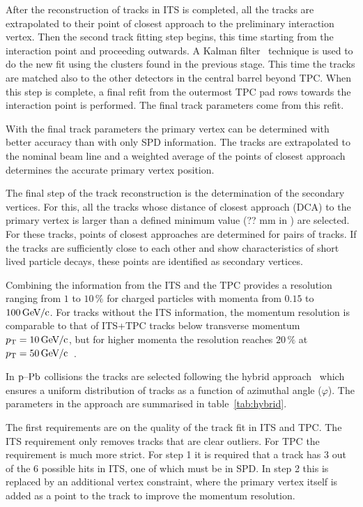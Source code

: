 After the reconstruction of tracks in ITS is completed, all the tracks are extrapolated to their point of closest approach to the preliminary interaction vertex. Then the second track fitting step begins, this time starting from the interaction point and proceeding outwards. A Kalman filter~\cite{Fruhwirth:1987fm} technique is used to do the new fit using the clusters found in the previous stage. This time the tracks are matched also to the other detectors in the central barrel beyond TPC. When this step is complete, a final refit from the outermost TPC pad rows towards the interaction point is performed. The final track parameters come from this refit. 

With the final track parameters the primary vertex can be determined with better accuracy than with only SPD information. The tracks are extrapolated to the nominal beam line and a weighted average of the points of closest approach determines the accurate primary vertex position.

The final step of the track reconstruction is the determination of the secondary vertices. For this, all the tracks whose distance of closest approach (DCA) to the primary vertex is larger than a defined minimum value (?? \unit{mm} in \pPb) are selected. For these tracks, points of closest approaches are determined for pairs of tracks. If the tracks are sufficiently close to each other and show characteristics of short lived particle decays, these points are identified as secondary vertices. 

Combining the information from the ITS and the TPC provides a resolution ranging from $1$ to $10\,\%$ for charged particles with momenta from $0.15$ to $\unit[100]{\GeVc}$. For tracks without the ITS information, the momentum resolution is comparable to that of ITS+TPC tracks below transverse momentum $\pt{} = \unit[10]{\GeVc}$, but for higher momenta the resolution reaches $20\,\%$ at $\pt{} = \unit[50]{\GeVc}$~\cite{alicePerformance,aliceBackgroundFluctuation}. 

In $\mbox{p--Pb}$ collisions the tracks are selected following the hybrid approach~\cite{hybridExplanation} which ensures a uniform distribution of tracks as a function of azimuthal angle ($\varphi$). The parameters in the approach are summarised in table~\ref{tab:hybrid}. 

The first requirements are on the quality of the track fit in ITS and TPC. The ITS requirement only removes tracks that are clear outliers. For TPC the requirement is much more strict. For step 1 it is required that a track has 3 out of the 6 possible hits in ITS, one of which must be in SPD. In step 2 this is replaced by an additional vertex constraint, where the primary vertex itself is added as a point to the track to improve the momentum resolution.

